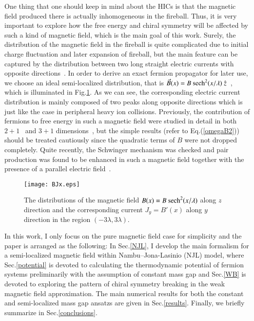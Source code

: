 \documentclass[aps,prd,amsmath,two column,amssymb,showpacs]{revtex4}
\begin{document}
One thing that one should keep in mind about the HICs is that the magnetic field produced there is actually inhomogeneous in the fireball. Thus, it is very important to explore how the free energy and chiral symmetry will be affected by such a kind of magnetic field, which is the main goal of this work. Surely, the distribution of the magnetic field in the fireball is quite complicated due to initial charge fluctuation and later expansion of fireball, but the main feature can be captured by the distribution between two long straight electric currents with opposite directions~\cite{Deng:2012pc}. In order to derive an exact fermion propagator for later use, we choose an ideal semi-localized distribution, that is $\vec{B}(x)=B~{\rm sech}^2(x/\lambda)~\hat{z}$~\cite{Cangemi:1995ee,Dunne:1997kw}, which is illuminated in Fig.\ref{BJx}. As we can see, the corresponding electric current distribution is mainly composed of two peaks along opposite directions which is just like the case in peripheral heavy ion collisions. Previously, the contribution of fermions to free energy in such a magnetic field were studied in detail in both $2+1$~\cite{Cangemi:1995ee} and $3+1$ dimensions~\cite{Dunne:1997kw}, but the simple results (refer to Eq.(\ref{omegaB2})) should be treated cautiously since the quadratic terms of $B$ were not dropped completely. Quite recently, the Schwinger mechanism was checked and pair production was found to be enhanced in such a magnetic field together with the presence of a parallel electric field~\cite{Copinger:2016llk}.
\begin{figure}[!htb]
	\begin{center}
		\texttt{[image: BJx.eps]}
		\caption{The distributions of the magnetic field $B(x)=B~{\rm sech}^2(x/\lambda)$ along $z$ direction and the corresponding current $J_y=B'(x)$ along $y$ direction in the region $(-3\lambda,3\lambda)$.\label{BJx}}
	\end{center}
\end{figure}

In this work, I only focus on the pure magnetic field case for simplicity and the paper is arranged as the following: In Sec.\ref{NJL}, I develop the main formalism for a semi-localized magnetic field within Nambu--Jona-Lasinio (NJL) model, where Sec.\ref{potential} is devoted to calculating the thermodynamic potential of fermion systems preliminarily with the assumption of constant mass gap and Sec.\ref{WB} is devoted to exploring the pattern of chiral symmetry breaking in the weak magnetic field approximation. The main numerical results for both the constant and semi-localized mass gap ansatzs are given in Sec.\ref{results}. Finally, we briefly summarize in Sec.\ref{conclusions}.
\end{document}
